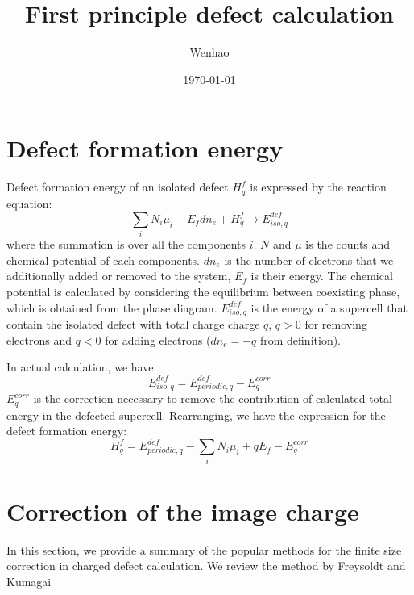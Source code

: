 \documentclass{article}
\begin{document}
\title{First principle defect calculation}
\author{Wenhao}
\date{\today}
\maketitle

\section{Defect formation energy}

Defect formation energy of an isolated defect $H^f_q$ is expressed by the reaction equation:
\begin{equation}
    \sum_i N_i \mu_i + E_f dn_e + H^f_q \to E^{def}_{iso,q}
\end{equation}
where the summation is over all the components $i$. $N$ and $\mu$ is the counts and 
chemical potential of each components. $dn_e$ is the number of electrons that we additionally 
added or removed to the system, $E_f$ is their energy. The chemical potential is calculated by 
considering the equilibrium between coexisting phase, which is obtained from the phase 
diagram\cite{Kuwabara2004}. $E^{def}_{iso,q}$ is the energy of a supercell that contain the isolated defect with total charge
charge $q$, $q > 0$ for removing electrons and $q < 0$ for adding electrons ($dn_e = - q$ from definition).

In actual calculation, we have:
\begin{equation}
    E^{def}_{iso,q} = E^{def}_{periodic,q} - E^{corr}_q
\end{equation}
$E^{corr}_q$ is the correction necessary to remove the contribution of calculated total 
energy in the defected supercell. Rearranging, we have the expression for the 
defect formation energy:
\begin{equation}
    H^{f}_q = E^{def}_{periodic,q} - \sum_i N_i \mu_i + qE_f - E^{corr}_q
\end{equation}

\section{Correction of the image charge}
In this section, we provide a summary of the popular methods for the 
finite size correction in charged defect calculation. We review the method
by Freysoldt\cite{Freydoldt2009} and Kumagai\cite{Kumagai2014}
\end{document}
